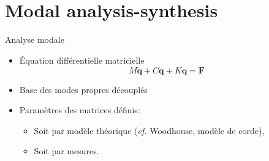\section{Modal analysis-synthesis}

\begin{frame}{Analyse modale}
 \begin{itemize}
  \item Équation différentielle matricielle
    \[ M \ddot{\bm{q}} + C \dot{\bm{q}} + K \bm{q} = \bm{F} \]
  \item Base des modes propres découplés
  \item Paramètres des matrices définis:
    \begin{itemize}
     \item Soit par modèle théorique (\emph{cf.} Woodhouse, modèle de corde),
     \item Soit par mesures.
    \end{itemize}
 \end{itemize}
\end{frame}